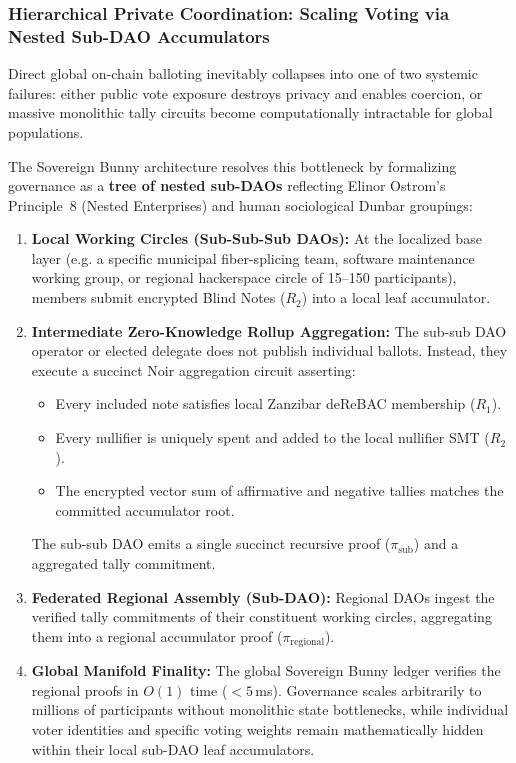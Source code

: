 \documentclass[a4paper,11pt,twoside,parskip=half-,headings=small]{scrartcl}
\begin{document}
\subsubsection{Hierarchical Private Coordination: Scaling Voting via Nested Sub-DAO Accumulators}
\label{sec:hierarchical_dao_voting}

Direct global on-chain balloting inevitably collapses into one of two systemic failures: either public vote exposure
destroys privacy and enables coercion, or massive monolithic tally circuits become computationally intractable
for global populations.

The Sovereign Bunny architecture resolves this bottleneck by formalizing governance as a \textbf{tree of nested sub-DAOs}
reflecting Elinor Ostrom's Principle~8 (Nested Enterprises) and human sociological Dunbar groupings:
\begin{enumerate}
  \item \textbf{Local Working Circles (Sub-Sub-Sub DAOs):} At the localized base layer (e.g. a specific municipal fiber-splicing team, software maintenance working group, or regional hackerspace circle of 15--150 participants), members submit encrypted Blind Notes ($R_2$) into a local leaf accumulator.
  \item \textbf{Intermediate Zero-Knowledge Rollup Aggregation:} The sub-sub DAO operator or elected delegate does not publish individual ballots. Instead, they execute a succinct Noir aggregation circuit asserting:
  \begin{itemize}
    \item Every included note satisfies local Zanzibar deReBAC membership ($R_1$).
    \item Every nullifier is uniquely spent and added to the local nullifier SMT ($R_2$).
    \item The encrypted vector sum of affirmative and negative tallies matches the committed accumulator root.
  \end{itemize}
  The sub-sub DAO emits a single succinct recursive proof ($\pi_{\text{sub}}$) and a aggregated tally commitment.
  \item \textbf{Federated Regional Assembly (Sub-DAO):} Regional DAOs ingest the verified tally commitments of their constituent working circles, aggregating them into a regional accumulator proof ($\pi_{\text{regional}}$).
  \item \textbf{Global Manifold Finality:} The global Sovereign Bunny ledger verifies the regional proofs in $O(1)$ time ($< 5$\,ms). Governance scales arbitrarily to millions of participants without monolithic state bottlenecks, while individual voter identities and specific voting weights remain mathematically hidden within their local sub-DAO leaf accumulators.
\end{enumerate}
\end{document}
